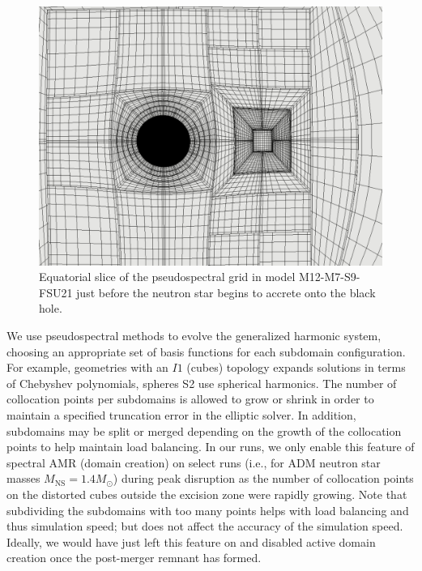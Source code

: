 \begin{figure}
	\centering
	\includegraphics[width=1.0\linewidth]{images/M12_FSU21-pseudospectral-grid}
	\caption[Equatorial slice of the pseudospectral grid]{Equatorial slice of the pseudospectral grid in model M12-M7-S9-FSU21 just before the neutron star begins to accrete onto the black hole.}
	\label{fig:pseudospectral-grid}
\end{figure}

We use pseudospectral methods to evolve the generalized harmonic system, choosing an appropriate set of basis functions for each subdomain configuration.  For example, geometries with an $I1$ (cubes) topology expands solutions in terms of Chebyshev polynomials, spheres S2 use spherical harmonics.  The number of collocation points per subdomains is allowed to grow or shrink in order to maintain a specified truncation error in the elliptic solver.  In addition, subdomains may be split or merged depending on the growth of the collocation points to help maintain load balancing.  In our runs, we only enable this feature of spectral AMR (domain creation) on select runs (i.e., for ADM neutron star masses $M_\textrm{NS} = 1.4 M_\odot$) during peak disruption as the number of collocation points on the distorted cubes outside the excision zone were rapidly growing.  Note that subdividing the subdomains with too many points helps with load balancing and thus simulation speed; but does not affect the accuracy of the simulation speed.  Ideally, we would have just left this feature on and disabled active domain creation once the post-merger remnant has formed.


